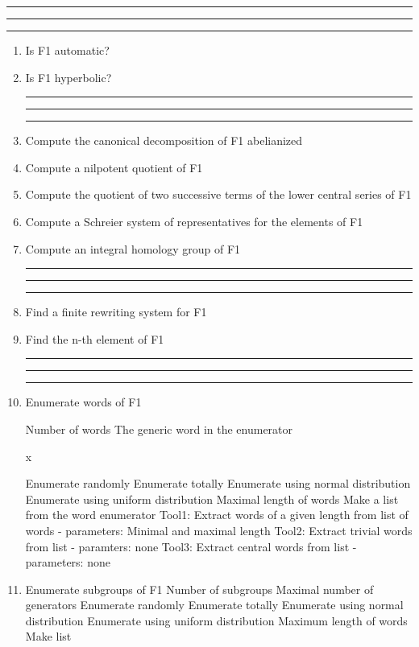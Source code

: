
\bigskip
\hrule\hrule\hrule

\begin{enumerate}

\item Is F1 automatic?

\item Is F1 hyperbolic?

\bigskip\noindent
\hrule\hrule\hrule

\item Compute the canonical decomposition of F1 abelianized

\item Compute a nilpotent quotient of F1

\item Compute the quotient of two successive terms of the
lower central series of F1

\item Compute a Schreier system of representatives for the elements of F1

\item Compute an integral homology group of F1

\bigskip\noindent
\hrule\hrule\hrule

\item Find a finite rewriting system for F1

\item Find the n-th element of F1

\bigskip
\hrule\hrule\hrule

\item Enumerate words of F1

\subitem Number of words
\subsubitem The generic word in the enumerator

\hskip 2.0in    x

\subsubitem Enumerate randomly
\subsubitem Enumerate totally
\subsubitem Enumerate using normal distribution
\subsubitem Enumerate using uniform distribution
\subsubitem Maximal length of words
\bigskip
\subitem Make a list from the word enumerator
\subsubitem Tool1: Extract words of a given length
from list of words - parameters: Minimal and maximal length
\subsubitem Tool2: Extract trivial words from list - paramters: none
\subsubitem Tool3: Extract central words from list - parameters: none
\bigskip
\item Enumerate subgroups of F1
\subitem Number of subgroups
\subitem Maximal number of generators
\subsubitem Enumerate randomly
\subsubitem Enumerate totally
\subsubitem Enumerate using normal distribution
\subsubitem Enumerate using uniform distribution
\subsubitem Maximum length of words
\bigskip
\subitem Make list
\bigskip


\end{enumerate}
